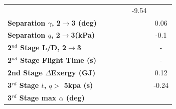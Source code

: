 \begin{table}[ht]
\begin{tabular}{l c c c c c c}
	& \secondthirdSeparationvmSPARTANNinetySevenFiveNoReturn
	& \secondthirdSeparationvmSPARTANStandardNoReturn
	& \secondthirdSeparationvmSPARTANOneHundredTwoFiveNoReturn
	& \secondthirdSeparationvmSPARTANOneHundredFiveNoReturn
	&-9.54
	\\
	\textbf{Separation $\gamma$, 2$\rightarrow$3 (deg)}
	& \secondthirdSeparationgammamSPARTANNinetyFiveNoReturn
	& \secondthirdSeparationgammamSPARTANNinetySevenFiveNoReturn
	& \secondthirdSeparationgammamSPARTANStandardNoReturn
	& \secondthirdSeparationgammamSPARTANOneHundredTwoFiveNoReturn
	& \secondthirdSeparationgammamSPARTANOneHundredFiveNoReturn
	&0.06
	\\
	\textbf{Separation $q$, 2$\rightarrow$3(kPa)}
	& \secondthirdSeparationqmSPARTANNinetyFiveNoReturn
	& \secondthirdSeparationqmSPARTANNinetySevenFiveNoReturn
	& \secondthirdSeparationqmSPARTANStandardNoReturn
	& \secondthirdSeparationqmSPARTANOneHundredTwoFiveNoReturn
	& \secondthirdSeparationqmSPARTANOneHundredFiveNoReturn
	&-0.1
	\\
	\textbf{2$^{nd}$ Stage L/D, 2$\rightarrow$3}
	& \secondthirdSeparationLDmSPARTANNinetyFiveNoReturn
	& \secondthirdSeparationLDmSPARTANNinetySevenFiveNoReturn
	& \secondthirdSeparationLDmSPARTANStandardNoReturn
	& \secondthirdSeparationLDmSPARTANOneHundredTwoFiveNoReturn
	& \secondthirdSeparationLDmSPARTANOneHundredFiveNoReturn
	& -
	\\
	\textbf{2$^{nd}$ Stage Flight Time (s)}
	& \secondFlightTimemSPARTANNinetyFiveNoReturn
	& \secondFlightTimemSPARTANNinetySevenFiveNoReturn
	& \secondFlightTimemSPARTANStandardNoReturn
	& \secondFlightTimemSPARTANOneHundredTwoFiveNoReturn
	& \secondFlightTimemSPARTANOneHundredFiveNoReturn
	& -
	\\
	\textbf{2nd Stage $\Delta$Exergy (GJ)}
	& \seconddExergymSPARTANNinetyFiveNoReturn
	& \seconddExergymSPARTANNinetySevenFiveNoReturn
	& \seconddExergymSPARTANStandardNoReturn
	& \seconddExergymSPARTANOneHundredTwoFiveNoReturn
	& \seconddExergymSPARTANOneHundredFiveNoReturn
	&0.12
	\\
	\textbf{3$^{rd}$ Stage $t$, $q >$ 5kpa (s)}
	& \thirdqOverFivemSPARTANNinetyFiveNoReturn
	& \thirdqOverFivemSPARTANNinetySevenFiveNoReturn
	& \thirdqOverFivemSPARTANStandardNoReturn
	& \thirdqOverFivemSPARTANOneHundredTwoFiveNoReturn
	& \thirdqOverFivemSPARTANOneHundredFiveNoReturn
	&-0.24
	\\
	\textbf{3$^{rd}$ Stage max $\alpha$ (deg)}
	& \thirdmaxAoAmSPARTANNinetyFiveNoReturn
	& \thirdmaxAoAmSPARTANNinetySevenFiveNoReturn
	& \thirdmaxAoAmSPARTANStandardNoReturn

\end{tabular}
\end{table}
